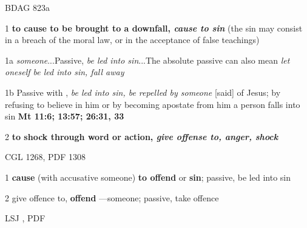 				\begin{compactdesc}
					\item[BDAG 823a] \textbf{}
						\begin{compactitem}
							\item[1] \textbf{to cause to be brought to a downfall, \textit{cause to sin}} (the sin may consist in a breach of the moral law, or in the acceptance of false teachings)
							\item[1a]  \textit{someone}...Passive, \textit{be led into sin}...The absolute passive can also mean \textit{let oneself be led into sin, fall away}
							\item[1b] Passive with , \textit{be led into sin, be repelled by someone} [said] of Jesus; by refusing to believe in him or by becoming apostate from him a person falls into sin \textbf{Mt 11:6; 13:57; 26:31, 33}
							\item[2] \textbf{to shock through word or action, \textit{give offense to, anger, shock}}
						\end{compactitem}
					\item[CGL 1268, PDF 1308] \textbf{}
						\begin{compactitem}
							\item[1] \textbf{cause} (with accusative someone) \textbf{to offend} or \textbf{sin}; passive, be led into sin
							\item[2] give offence to, \textbf{offend} ---someone; passive, take offence
						\end{compactitem}
					\item[LSJ , PDF ] \textbf{}
						\begin{compactitem}
							\item 
						\end{compactitem}
				\end{compactdesc}
				
		
	
